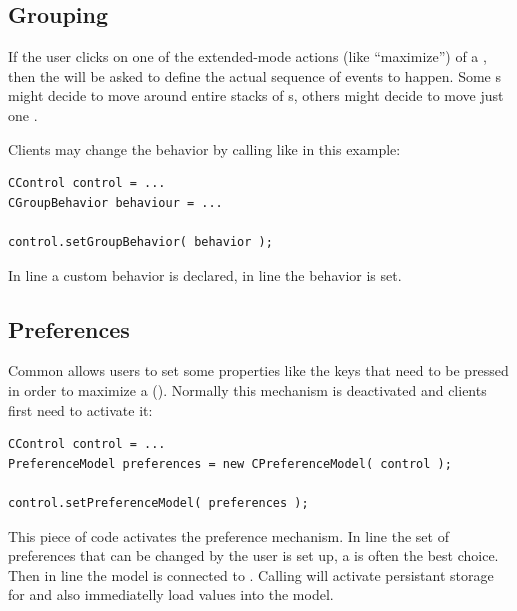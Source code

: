 

\subsection{Grouping}
If the user clicks on one of the extended-mode actions (like ``maximize'') of a , then the  will be asked to define the actual sequence of events to happen. Some s might decide to move around entire stacks of s, others might decide to move just one .

Clients may change the behavior by calling  like in this example:
\begin{lstlisting}
CControl control = ...
CGroupBehavior behaviour = ...

control.setGroupBehavior( behavior );
\end{lstlisting}
In line  a custom behavior is declared, in line  the behavior is set.


\subsection{Preferences} \label{sec:preferences}
Common allows users to set some properties like the keys that need to be pressed in order to maximize a  (). Normally this mechanism is deactivated and clients first need to activate it:
\begin{lstlisting}
CControl control = ...
PreferenceModel preferences = new CPreferenceModel( control );

control.setPreferenceModel( preferences );
\end{lstlisting}
This piece of code activates the preference mechanism. In line  the set of preferences that can be changed by the user is set up, a  is often the best choice. Then in line  the model is connected to . Calling  will activate persistant storage for  and also immediatelly load values into the model.

